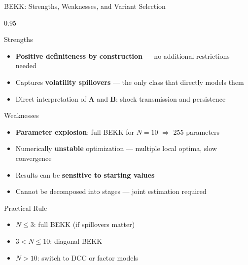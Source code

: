 \documentclass[9pt, aspectratio=169, t]{beamer}
\begin{document}
\begin{frame}{BEKK: Strengths, Weaknesses, and Variant Selection}
    \begin{cminipage}{0.95\textwidth}
    \vspace{-3mm}
    {\scriptsize
    \begin{block}{Strengths}
        \begin{itemize}\setlength{\itemsep}{0pt}
            \item \textbf{Positive definiteness by construction} --- no additional restrictions needed
            \item Captures \textbf{volatility spillovers} --- the only class that directly models them
            \item Direct interpretation of $\mathbf{A}$ and $\mathbf{B}$: shock transmission and persistence
        \end{itemize}
    \end{block}
    \begin{alertblock}{Weaknesses}
        \begin{itemize}\setlength{\itemsep}{0pt}
            \item \textbf{Parameter explosion}: full BEKK for $N=10$ $\Rightarrow$ 255 parameters
            \item Numerically \textbf{unstable} optimization --- multiple local optima, slow convergence
            \item Results can be \textbf{sensitive to starting values}
            \item Cannot be decomposed into stages --- joint estimation required
        \end{itemize}
    \end{alertblock}
    \begin{block}{Practical Rule}
        \begin{itemize}\setlength{\itemsep}{0pt}
            \item $N \leq 3$: full BEKK (if spillovers matter)
            \item $3 < N \leq 10$: diagonal BEKK
            \item $N > 10$: switch to DCC or factor models
        \end{itemize}
    \end{block}
    }
    \end{cminipage}
\end{frame}

\end{document}
